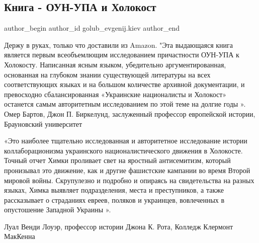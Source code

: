  
 
 
 
 
 
\subsection{Книга - ОУН-УПА и Холокост}
\label{sec:14_11_2021.fb.golub_evgenij.kiev.1.oun_upa_holokost}
 
\ifcmt
 author_begin
   author_id golub_evgenij.kiev
 author_end
\fi


Держу в руках, только что доставили из Amazon. "Эта выдающаяся книга является
первым всеобъемлющим исследованием причастности ОУН-УПА к Холокосту.
Написанная ясным языком, убедительно аргументированная, основанная на глубоком
знании существующей литературы на всех соответствующих языках и на большом
количестве архивной документации, и превосходно сбалансированная  «Украинские
националисты и Холокост» останется  самым авторитетным исследованием по этой
теме на долгие годы ».  Омер Бартов, Джон П. Биркелунд, заслуженный профессор
европейской истории, Брауновский университет 

«Это наиболее тщательно исследованная и авторитетное исследование истории
коллаборационизма украинского националистического движения в Холокосте. Точный
отчет Химки проливает свет на яростный антисемитизм, который пронизывал это
движение, как и другие фашистские кампании во время Второй мировой войны.
Скрупулезно и подробно и опираясь на свидетельства на разных языках, Химка
выявляет подразделения, места и преступников, а также рассказывает о страданиях
евреев, поляков и украинцев, вовлеченных в опустошение Западной Украины ».  

Луал Венди Лоуэр, профессор истории Джона К. Рота, Колледж Клермонт МакКенна

